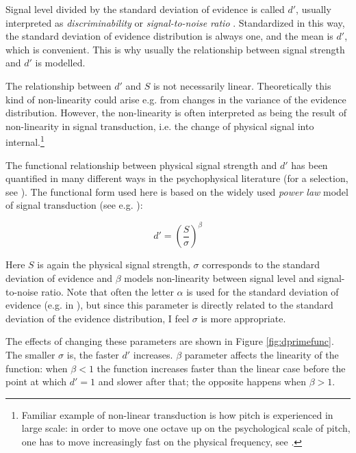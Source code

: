 \documentclass{article}\usepackage{knitr}
\begin{document}
Signal level divided by the standard deviation of evidence is called $d'$, usually interpreted as \textit{discriminability} \citep[Chapter 6]{kingdomprins2010} or \textit{signal-to-noise ratio} \citep{kontsevichtyler1999}. Standardized in this way, the standard deviation of evidence distribution is always one, and the mean is $d'$, which is convenient. This is why usually the relationship between signal strength and $d'$ is modelled. 

The relationship between $d'$ and $S$ is not necessarily linear. Theoretically this kind of non-linearity could  arise e.g. from changes in the variance of the evidence distribution. However, the non-linearity is often interpreted as being the result of non-linearity in signal transduction, i.e. the change of physical signal into internal.\footnote{Familiar example of non-linear transduction is how pitch is experienced in large scale: in order to move one octave up on the psychological scale of pitch, one has to move increasingly fast on the physical frequency, see \citet[Chapter 5]{zwickerfastl}.}

The functional relationship between physical signal strength and $d'$ has been quantified in many different ways in the psychophysical literature (for a selection, see \citet[Appendix A]{lesmes2015}). The functional form used here is based on the widely used \textit{power law} model of signal transduction (see e.g. \citet{kontsevichtyler1999, dai2011, lesmes2015}):

\begin{equation}
d' = (\frac{S}{\sigma})^\beta
\label{eq:dprimefunc}
\end{equation}

Here $S$ is again the physical signal strength, $\sigma$ corresponds to the standard deviation of evidence and $\beta$ models non-linearity between signal level and signal-to-noise ratio. Note that often the letter $\alpha$ is used for the standard deviation of evidence (e.g. in \cite{dai2011, kontsevichtyler1999, kingdomprins2010}), but since this parameter is directly related to the standard deviation of the evidence distribution, I feel $\sigma$ is more appropriate. 

The effects of changing these parameters are shown in Figure \ref{fig:dprimefunc}. The smaller $\sigma$ is, the faster $d'$ increases. $\beta$ parameter affects the linearity of the function: when $\beta < 1$ the function increases faster than the linear case before the point at which $d' = 1$ and slower after that; the opposite happens when $\beta > 1$. 
\end{document}
